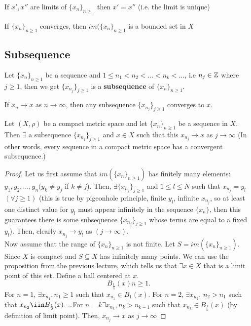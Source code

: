 \documentclass[a4paper]{article}
\begin{document}
\begin{prop}
  If $x', x''$ are limits of  $\{x_n\}_{n \geq_1}$ then $x' = x''$ (i.e. the limit is unique)
\end{prop}

\begin{prop}
  If $\{x_n\}_{n \geq 1}$ converges, then $im(\{x_n\}_{n \geq 1}$ is a bounded set in $X$
\end{prop}

\subsection{Subsequence}
\begin{definition}
  Let $\{x_n\}_{n \geq 1}$ be a sequence and $1 \leq n_1 < n_2 < \ldots < n_k < \ldots$, i.e $n_j \in \mathbb{Z}$ where $j \geq 1$, then we get  $\{x_{n_j}\}_{j \geq 1} $ is a \textbf{subsequence} of $\{x_n\}_{n \geq 1} $.
\end{definition}

\begin{prop}
  If $x_n \to x$ as  $n \to \infty$, then any subsequence  $\{x_{n_j}\}_{j \geq 1} $ converges to $x$. 
\end{prop}

\begin{theorem}
  Let $(X, \rho)$ be a compact metric space and let  $\{x_n\}_{n \geq 1} $ be a sequence in $X$. Then  $\exists $ 
  a subsequence $\{x_{n_j}\}_{j \geq 1} $ and $x \in X$ such that this  $x_{n_j} \to x$ as $j \to \infty$ (In other words, every sequence in a compact metric space has a convergent subsequence.)

  \begin{proof}
    Let us first assume that $im(\{x_n\}_{n \geq 1}) $ has finitely many elements: $y_1, y_2, \ldots, y_n (y_k \neq y_j$ if $k \neq j$). Then, $\exists \{x_{n_j}\}_{j \geq 1} $ and $1 \leq l \leq N$  such that $x_{n_j} = y_l$ $(\forall j \geq 1)$ (this is true by pigeonhole principle, finite $y_l$, infinite  $x_{n_j}$, so at least one distinct value for $y_l$ must appear infinitely in the sequence $\{x_n\}$, then this guarantees there is some subsequence $\{x_{n_j}\}_{j \geq 1} $ whose terms are equal to a fixed $y_l$). Then, clearly $x_{n_j} \to y_l$ as $(j \to \infty)$. \\


    Now assume that the range of $\{x_n\}_{n \geq 1} $ is not finite. Let $S = im(\{x_n\}_{n \geq 1}) $. Since $X$ is compact and $S \subseteq X$ has infinitely many points. We can use the proposition from the previous lecture, which tells us that  $\exists x \in X$ that is a limit point of this set. Define a ball centered at $x$. 
    \[
    B_{\frac{1}{n}} (x) n \geq 1
    .\] 
    For $n = 1$,  $\exists x_{n_1}, n_1 \geq 1$ such that $x_{n_1} \in B_1 (x)$. For $n=2$, $\exists x_{n_2}$, $n_2 > n_1$ such that  $x_{n_2} \iin B_{\frac{1}{2}} (x)$. \ldots For $n = k \exists  x_{n_k}, n_k > n_{k-1}$ such that $x_{n_k} \in B_{\frac{1}{k}}(x)$ (by definition of limit point). Then, $x_{n_j} \to x$ as $j \to \infty$ 
  \end{proof}
\end{theorem}
\end{document}
